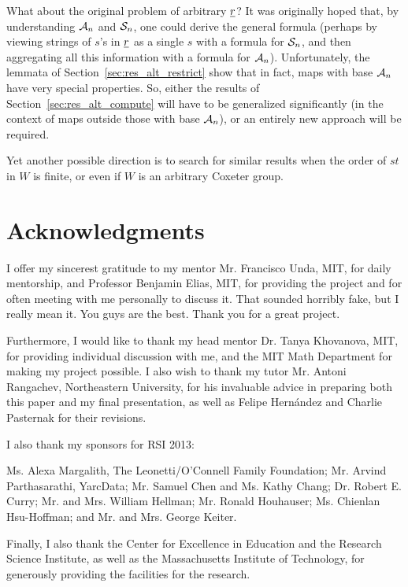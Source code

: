 What about the original problem of arbitrary $\ul r$?  It was originally hoped that, by understanding $\AA_n$ and $\SS_n$, one could derive the general formula (perhaps by viewing strings of $s$'s in $\ul r$ as a single $s$ with a formula for $\SS_n$, and then aggregating all this information with a formula for $\AA_n$).  Unfortunately, the lemmata of Section~\ref{sec:res_alt_restrict} show that in fact, maps with base $\AA_n$ have very special properties.  So, either the results of Section~\ref{sec:res_alt_compute} will have to be generalized significantly (in the context of maps outside those with base $\AA_n$), or an entirely new approach will be required.

Yet another possible direction is to search for similar results when the order of $st$ in $W$ is finite, or even if $W$ is an arbitrary Coxeter group.

\section{Acknowledgments} 
I offer my sincerest gratitude to my mentor Mr. Francisco Unda, MIT, for daily mentorship, and Professor Benjamin Elias, MIT, for providing the project and for often meeting with me personally to discuss it.  That sounded horribly fake, but I really mean it.  You guys are the best.  Thank you for a great project.

Furthermore, I would like to thank my head mentor Dr. Tanya Khovanova, MIT, for providing individual discussion with me, and the MIT Math Department for making my project possible.
I also wish to thank my tutor Mr. Antoni Rangachev, Northeastern University, for his invaluable advice in preparing both this paper and my final presentation, as well as Felipe Hern\'andez and Charlie Pasternak for their revisions.

I also thank my sponsors for RSI 2013:
\begin{inparaenum}[]
	\ii Ms. Alexa Margalith, The Leonetti\slash O'Connell Family Foundation;
	\ii Mr. Arvind Parthasarathi, YarcData;
	\ii Mr. Samuel Chen and Ms. Kathy Chang;
	\ii Dr. Robert E. Curry;
	\ii Mr. and Mrs. William Hellman;
	\ii Mr. Ronald Houhauser;
	\ii Ms. Chienlan Hsu-Hoffman; and
	\ii Mr. and Mrs. George Keiter.
\end{inparaenum}

Finally, I also thank the Center for Excellence in Education and the Research Science Institute, as well as the Massachusetts Institute of Technology, for generously providing the facilities for the research.
